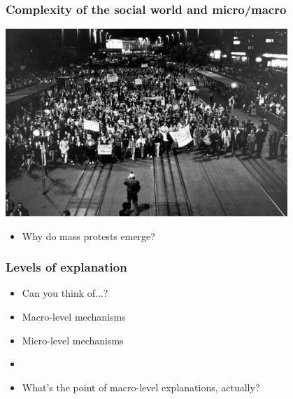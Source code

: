 \documentclass[aspectratio=43]{beamer}
\begin{document}
\begin{frame}
\frametitle{Complexity of the social world and micro/macro}
\centering

\includegraphics[width = 0.8\textwidth]{../img/leipzig1989}

\begin{itemize}
  \item Why do mass protests emerge?
\end{itemize}

\end{frame}

\begin{frame}
\frametitle{Levels of explanation}
\centering

\begin{itemize}
\item[] Can you think of...?
\item Macro-level mechanisms
\item Micro-level mechanisms
\item[]
\item<2-> What's the point of macro-level explanations, actually?
\end{itemize}

\end{frame}

%
%
\end{document}
